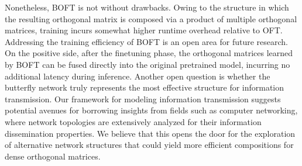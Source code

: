 Nonetheless, BOFT is not without drawbacks. Owing to the structure in which the resulting orthogonal matrix is composed via a product of multiple orthogonal matrices, training incurs somewhat higher runtime overhead relative to OFT. Addressing the training efficiency of BOFT is an open area for future research. On the positive side, after the finetuning phase, the orthogonal matrices learned by BOFT can be fused directly into the original pretrained model, incurring no additional latency during inference. Another open question is whether the butterfly network truly represents the most effective structure for information transmission. Our framework for modeling information transmission suggests potential avenues for borrowing insights from fields such as computer networking, where network topologies are extensively analyzed for their information dissemination properties. We believe that this opens the door for the exploration of alternative network structures that could yield more efficient compositions for dense orthogonal matrices.

